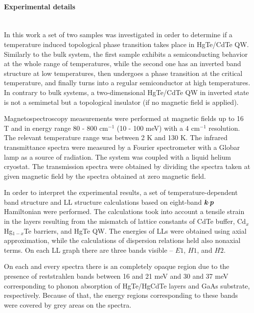 \documentclass[titlepage,a4paper]{book}
\newcommand{\wciecie}{\quad\phantom{v}}
\newcommand{\myparagraph}[1]{\paragraph{#1}\mbox{}\\}
\begin{document}
\myparagraph{Experimental details}
\wciecie
In this work a set of two samples was investigated in order to determine if a temperature induced topological phase transition takes place in HgTe/CdTe QW. Similarly to the bulk system, the first sample exhibits a semiconducting behavior at the whole range of temperatures, while the second one has an inverted band structure at low temperatures, then undergoes a phase transition at the critical temperature, and finally turns into a regular semiconductor at high temperatures. In contrary to bulk systems, a two-dimensional HgTe/CdTe QW in inverted state is not a semimetal but a topological insulator (if no magnetic field is applied). 

Magnetospectroscopy measurements were performed at magnetic fields up to 16 T and in energy range 80 - 800 cm$^{-1}$ (10 - 100 meV) with a 4 cm$^{-1}$ resolution. The relevant temperature range was between 2 K and 130 K. The infrared transmittance spectra were measured by a Fourier spectrometer with a Globar lamp as a source of radiation. The system was coupled with a liquid helium cryostat. The transmission spectra were obtained by dividing the spectra taken at given magnetic field by the spectra obtained at zero magnetic field.

In order to interpret the experimental results, a set of temperature-dependent band structure and LL structure calculations based on eight-band \textbf{\textit{k}}$\cdot$\textbf{\textit{p}} Hamiltonian were performed. The calculations took into account a tensile strain in the layers resulting from the mismatch of lattice constants of CdTe buffer, Cd$_{x}$Hg$_{1-x}$Te barriers, and HgTe QW. The energies of LLs were obtained using axial approximation, while the calculations of dispersion relations held also nonaxial terms. On each LL graph there are three bands visible -- $E1$, $H1$, and $H2$.

On each and every spectra there is an completely opaque region due to the presence of reststrahlen bands between 16 and 21 meV and 30 and 37 meV corresponding to phonon absorption of HgTe/HgCdTe layers and GaAs substrate, respectively. Because of that, the energy regions corresponding to these bands were covered by grey areas on the spectra.
\end{document}
